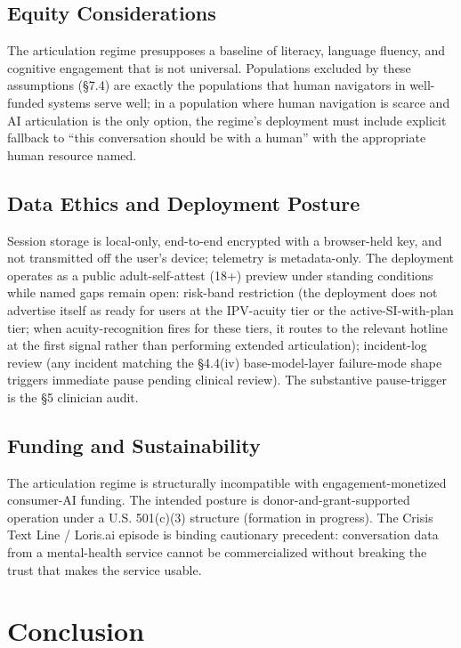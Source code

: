 \documentclass[letterpaper]{article}
\begin{document}
\subsection{Equity Considerations}

The articulation regime presupposes a baseline of literacy, language fluency, and cognitive engagement that is not universal. Populations excluded by these assumptions (\S7.4) are exactly the populations that human navigators in well-funded systems serve well; in a population where human navigation is scarce and AI articulation is the only option, the regime's deployment must include explicit fallback to ``this conversation should be with a human'' with the appropriate human resource named.

\subsection{Data Ethics and Deployment Posture}

Session storage is local-only, end-to-end encrypted with a browser-held key, and not transmitted off the user's device; telemetry is metadata-only. The deployment operates as a public adult-self-attest (18+) preview under standing conditions while named gaps remain open: risk-band restriction (the deployment does not advertise itself as ready for users at the IPV-acuity tier or the active-SI-with-plan tier; when acuity-recognition fires for these tiers, it routes to the relevant hotline at the first signal rather than performing extended articulation); incident-log review (any incident matching the \S4.4(iv) base-model-layer failure-mode shape triggers immediate pause pending clinical review). The substantive pause-trigger is the \S5 clinician audit.

\subsection{Funding and Sustainability}

The articulation regime is structurally incompatible with engagement-monetized consumer-AI funding. The intended posture is donor-and-grant-supported operation under a U.S. 501(c)(3) structure (formation in progress). The Crisis Text Line / Loris.ai episode \citep{politico2022crisistext} is binding cautionary precedent: conversation data from a mental-health service cannot be commercialized without breaking the trust that makes the service usable.

\section{Conclusion}
\end{document}

